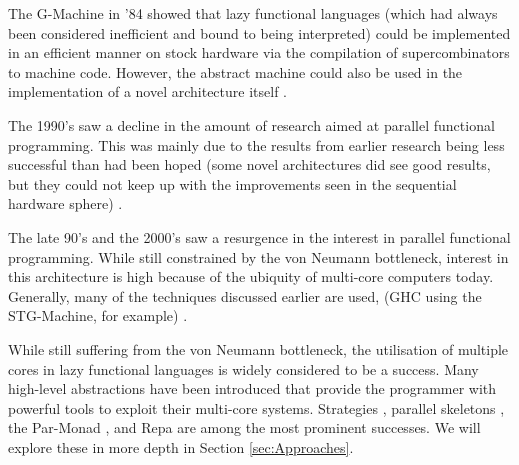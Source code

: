 The G-Machine in '84 showed that lazy functional languages (which had always
been considered inefficient and bound to being interpreted) could be
implemented in an efficient manner on stock hardware via the compilation of
supercombinators to machine code. However, the abstract machine could also be
used in the implementation of a novel architecture itself
\citep{Augustsson:LazyMLCompiler}.

    The 1990's saw a decline in the amount of research aimed at parallel
functional programming. This was mainly due to the results from earlier research
being less successful than had been hoped (some novel architectures did see good
results, but they could not keep up with the improvements seen in the sequential
hardware sphere) \citep{PFPAnIntro, clackbook}.

The late 90's and the 2000's saw a resurgence in the interest in parallel
functional programming. While still constrained by the von Neumann bottleneck,
interest in this architecture is high because of the ubiquity of multi-core
computers today. Generally, many of the techniques discussed earlier are used,
(GHC using the STG-Machine, for example) \citep{buckwheat, haskellSharedMem}.


While still suffering from the von Neumann bottleneck, the utilisation of
multiple cores in lazy functional languages is widely considered to be a
success. Many high-level abstractions have been introduced that provide the
programmer with powerful tools to exploit their multi-core systems. Strategies
\citep{strategies}, parallel skeletons \citep{skeletons}, the Par-Monad
\citep{marlow2011monad}, and Repa \citep{repa} are among the most prominent
successes. We will explore these in more depth in Section \ref{sec:Approaches}.
